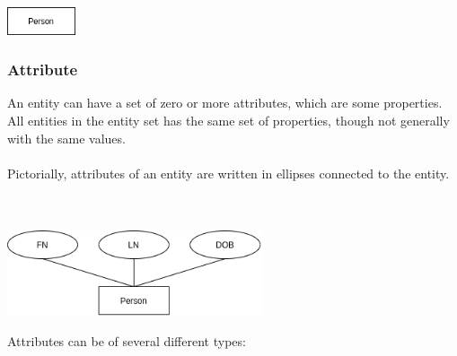 \documentclass{article}
\begin{document}
\centerline{\includegraphics[width=2cm]{./assets/entity.png}}
	
\subsubsection{Attribute}
An entity can have a set of zero or more attributes, which are some properties. All entities in the entity set has the same set of properties, though not generally with the same values. \\ \\
Pictorially, attributes of an entity are written in ellipses connected to the entity. \\ \\ \\

\centerline{\includegraphics[width=7.5cm]{./assets/attribute.png}}
\vspace{.6cm}
Attributes can be of several different types:
\end{document}
